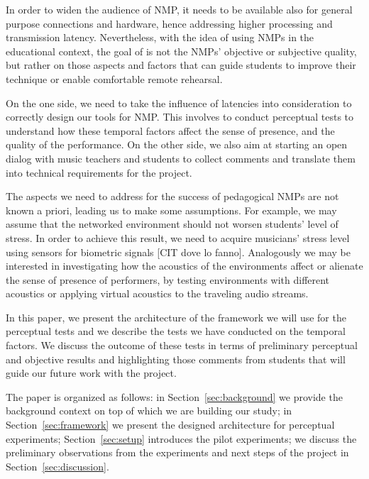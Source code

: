 In order to widen the audience of NMP, it needs to be available also for general purpose connections and hardware, hence addressing higher processing and transmission latency. Nevertheless, with the idea of using NMPs in the educational context, the goal of is not the NMPs' objective or subjective quality, but rather on those aspects and factors that can guide students to improve their technique or enable comfortable remote rehearsal. 

On the one side, we need to take the influence of latencies into consideration to correctly design our tools for NMP. This involves to conduct perceptual tests to understand how these temporal factors affect the sense of presence, and the quality of the performance. On the other side, we also aim at starting an open dialog with music teachers and students to collect comments and translate them into technical requirements for the project. 

The aspects we need to address for the success of pedagogical NMPs are not known a priori, leading us to make some assumptions. For example, we may assume that the networked environment should not worsen students' level of stress. In order to achieve this result, we need to acquire musicians' stress level using sensors for biometric signals [CIT dove lo fanno]. Analogously we may be interested in investigating how the acoustics of the environments affect or alienate the sense of presence of performers, by testing environments with different acoustics or applying virtual acoustics to the traveling audio streams.

In this paper, we present the architecture of the framework we will use for the perceptual tests and we describe the tests we have conducted on the temporal factors. We discuss the outcome of these tests in terms of preliminary perceptual and objective results and highlighting those comments from students that will guide our future work with the project.

The paper is organized as follows: in Section~\ref{sec:background} we provide the background context on top of which we are building our study; in Section~\ref{sec:framework} we present the designed architecture for perceptual experiments; Section~\ref{sec:setup} introduces the pilot experiments; we discuss the preliminary observations from the experiments and next steps of the project in Section~\ref{sec:discussion}.

